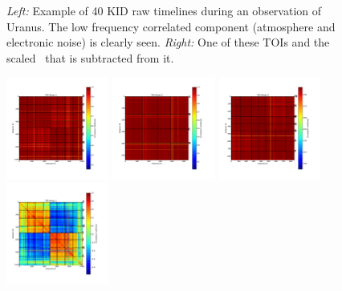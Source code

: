 \begin{figure}[ht!]
\begin{center}
\caption[Example of Time-Ordered-Information]{\emph{Left:} Example of 40 KID raw timelines during an observation
  of Uranus. The low frequency correlated component (atmosphere and electronic
  noise) is clearly seen. \emph{Right:} One of these TOIs and the scaled
  \cm\ that is subtracted from it.}
\label{fig:nika_toi}
\end{center}
\end{figure}

\begin{figure}[ht!] 
\begin{center}
\includegraphics[width=0.3\textwidth]{Figures/NoiseTests/corrmat_TOI_array_1_20170228s151.pdf}
\includegraphics[width=0.3\textwidth]{Figures/NoiseTests/corrmat_TOI_array_2_20170228s151.pdf}
\includegraphics[width=0.3\textwidth]{Figures/NoiseTests/corrmat_TOI_array_3_20170228s151.pdf}
\includegraphics[width=0.3\textwidth]{Figures/NoiseTests/corrmat_TOI_CM_array_1_20170228s151.pdf}

\end{center}
\end{figure}
